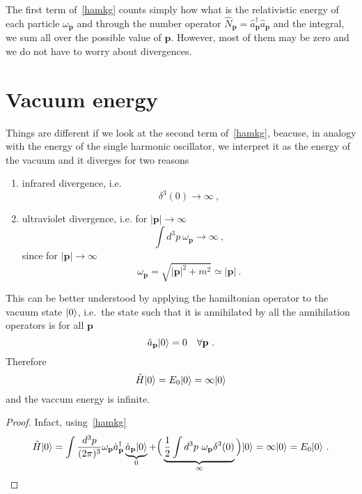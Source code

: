    The first term of~\eqref{hamkg} counts simply how what is the relativistic energy of each particle $\omega_{\mathbf p}$ and through the number operator $\hat N_{\mathbf p} = \hat a_{\mathbf p}^\dagger \hat a_{\mathbf p}$ and the integral, we sum all over the possible value of $\mathbf p$. However, most of them may be zero and we do not have to worry about divergences. 

\section{Vacuum energy}
    Things are different if we look at the second term of~\eqref{hamkg}, beacuse, in analogy with the energy of the single harmonic oscillator, we interpret it as the energy of the vacuum and it diverges for two reasons
    \begin{enumerate}
        \item infrared divergence, i.e. 
            \begin{equation*}
                \delta^3 (0) \rightarrow \infty~,
            \end{equation*}
        \item ultraviolet divergence, i.e. for $|\mathbf p| \rightarrow \infty$
            \begin{equation*}
            \int d^3 p ~ \omega_{\mathbf p} \rightarrow \infty ~,
        \end{equation*} 
            since for $|\mathbf p| \rightarrow \infty$
            \begin{equation*}
                \omega_{\mathbf p} = \sqrt{|\mathbf p|^2 + m^2} \simeq |\mathbf p| ~.
            \end{equation*}
    \end{enumerate}

    This can be better understood by applying the hamiltonian operator to the vacuum state $\vert0\rangle$, i.e.~the state such that it is annihilated by all the annihilation operators is for all $\mathbf p$
    \begin{equation*}
        \hat a_{\mathbf p} \vert0\rangle = 0 \quad \forall \mathbf p ~.
    \end{equation*}
    Therefore 
    \begin{equation*}
        \hat H \vert0\rangle = E_0 \vert0\rangle = \infty \vert0\rangle
    \end{equation*}
    and the vaccum energy is infinite.
    \begin{proof}
        Infact, using~\eqref{hamkg}
        \begin{equation*}
            \hat H \vert0\rangle = \int \frac{d^3 p}{(2\pi)^3} \omega_{\mathbf p} \hat a_{\mathbf p}^\dagger \underbrace{\hat a_{\mathbf p} \vert0\rangle}_0 + \Big (\underbrace{\frac{1}{2} \int d^3 p ~ \omega_{\mathbf p} \delta^3 (0)}_\infty \Big ) \vert0\rangle = \infty \vert0\rangle = E_0 \vert0\rangle ~.
        \end{equation*}
    \end{proof}

